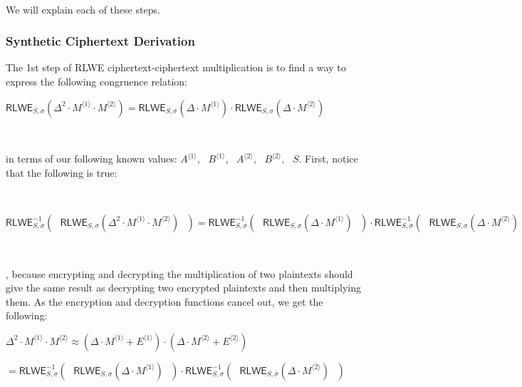$ $

\noindent We will explain each of these steps.  


\subsubsection{Synthetic Ciphertext Derivation}
\label{subsubsec:ckks-mult-cipher-relation}


The 1st step of RLWE ciphertext-ciphertext multiplication is to find a way to express the following congruence relation: 

$\textsf{RLWE}_{S, \sigma}(\Delta^2 \cdot M^{\langle 1 \rangle} \cdot M^{\langle 2 \rangle}) = \textsf{RLWE}_{S, \sigma}(\Delta \cdot M^{\langle 1 \rangle}) \cdot \textsf{RLWE}_{S, \sigma}(\Delta \cdot M^{\langle 2 \rangle})$

$ $

in terms of our following known values: $A^{\langle 1 \rangle}, \text{ } B^{\langle 1 \rangle}, \text{ } A^{\langle 2 \rangle}, \text{ } B^{\langle 2 \rangle}, \text{ } S$. First, notice that the following is true:

$ $

\hspace{-5mm}\noindent $\textsf{RLWE}^{-1}_{S, \sigma}(\text{ } \textsf{RLWE}_{S, \sigma}(\Delta^2 \cdot M^{\langle 1 \rangle} \cdot M^{\langle 2 \rangle}) \textsf{ } )= \textsf{RLWE}^{-1}_{S, \sigma}(\text{ }  \textsf{RLWE}_{S, \sigma}(\Delta \cdot M^{\langle 1 \rangle}) \text{ } ) \cdot \textsf{RLWE}^{-1}_{S, \sigma}(\text{ } \textsf{RLWE}_{S, \sigma}(\Delta \cdot M^{\langle 2 \rangle})  \text{ } )$

$ $

\noindent , because encrypting and decrypting the multiplication of two plaintexts should give the same result as decrypting two encrypted plaintexts and then multiplying them. As the encryption and decryption functions cancel out, we get the following:

\noindent $\Delta^2 \cdot M^{\langle 1 \rangle} \cdot M^{\langle 2 \rangle} \approx (\Delta \cdot M^{\langle 1 \rangle} + E^{\langle 1 \rangle} ) \cdot ( \Delta \cdot M^{\langle 2 \rangle} + E^{\langle 2 \rangle} ) $

$ = \textsf{RLWE}^{-1}_{S, \sigma}(\text{ }  \textsf{RLWE}_{S, \sigma}(\Delta \cdot M^{\langle 1 \rangle}) \text{ } ) \cdot \textsf{RLWE}^{-1}_{S, \sigma}(\text{ } \textsf{RLWE}_{S, \sigma}(\Delta \cdot M^{\langle 2 \rangle})  \text{ } )$

